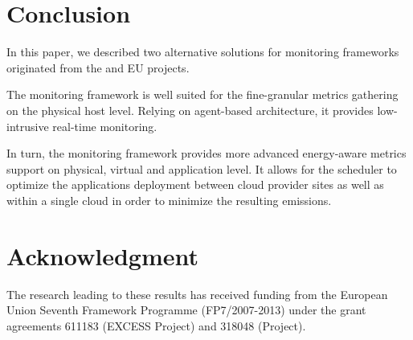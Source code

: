 \documentclass[10pt,letterpaper]{IEEEtran}
\begin{document}
 \section{Conclusion}
\label{sec:conclusion}

\noindent
In this paper, we described two alternative solutions for monitoring frameworks originated from the \ECO and
\EXCESS EU projects.

The \EXCESS monitoring framework is well suited for the fine-granular metrics gathering on the physical host level.
Relying on agent-based architecture, it provides low-intrusive real-time monitoring.

In turn, the \ECO monitoring framework provides more advanced energy-aware metrics support on physical,
virtual and application level. It allows for the scheduler to optimize the applications deployment
between cloud provider sites as well as within a single cloud in order to minimize the resulting  emissions.


\section*{Acknowledgment}
The research leading to these results has received funding from the European Union
Seventh Framework Programme (FP7/2007-2013) under the grant agreements 611183 (EXCESS Project)
and 318048 (\ECO Project). 

\newcommand{\BIBdecl}{\setlength{\itemsep}{0.28em}}



\end{document}
